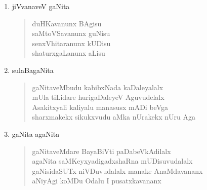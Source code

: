 \begin{enumerate}[\rm 1)]
\item jiVvanaveV gaNita
\begin{center}
\begin{verse}
duHKavanunx BAgisu\\
saMtoVSavanunx guNisu\\
senxVhitaranunx kUDisu\\
shaturxgaLanunx aLisu
\end{verse}
\end{center}

\item sulaBagaNita
\begin{center} 
\begin{verse}
gaNitaveMbudu kabibxNada kaDaleyalalx\\
mUla tiLidare hurigaDaleyeV Aguvudelalx\\
Asakitxyali kaliyalu manasusx mADi beVga\\
sharxmakekx sikukxvudu aMka nUrakekx nUru Aga
\end{verse}
\end{center}

\item gaNita agaNita
\begin{center} 
\begin{verse}
gaNitaveMdare BayaBiVti paDabeVkAdilalx\\
agaNita saMKeyxyadigadxshaRna mUDisuvudalalx\\
gaNisidaSUTx niVDuvudalalx manake AnaMdavananx\\
aNiyAgi koMDu Odalu I pusatxkavananx
\end{verse}
\end{center}
\end{enumerate}
